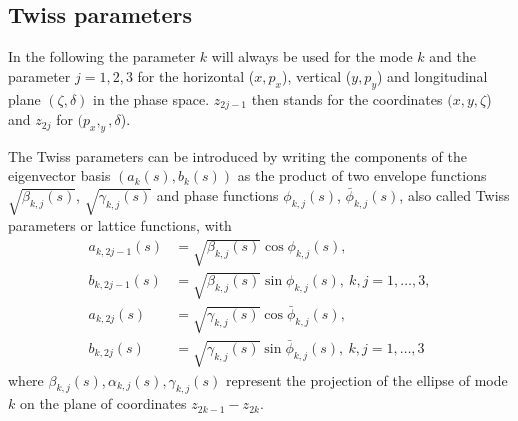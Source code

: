 \subsection{Twiss parameters}
\label{opt:sec:4}
In the following the parameter $k$ will always be used for the mode $k$ and the parameter
$j=1,2,3$ for the horizontal ($x,p_x$), vertical ($y,p_y$) and longitudinal plane
$(\zeta,\delta)$ in the phase space. $z_{2j-1}$ then stands for the coordinates $(x,y,\zeta$)
and $z_{2j}$ for $(p_x,_y,\delta$).

The Twiss parameters can be introduced by writing the components of the eigenvector basis
$(a_k(s),b_k(s))$ as the product of two envelope functions $\sqrt{\beta_{k,j}(s)}$,
$\sqrt{\gamma_{k,j}(s)}$ and phase functions $\phi_{k,j}(s)$, $\bar\phi_{k,j}(s)$,
also called Twiss parameters or lattice functions, with
\begin{align}
a_{k,2j-1}(s)&=\sqrt{\beta_{k,j}(s)}\cos{\phi_{k,j}(s)},\nonumber\\ b_{k,2j-1}(s)&=\sqrt{\beta_{k,j}(s)}\sin{\phi_{k,j}(s)}, \ k,j=1,\ldots,3, \label{opt:eqn:4:1}\\
a_{k,2j}(s)&=\sqrt{\gamma_{k,j}(s)}\cos{\bar\phi_{k,j}(s)}, \nonumber\\
b_{k,2j}(s)&=\sqrt{\gamma_{k,j}(s)}\sin{\bar\phi_{k,j}(s)}, \ k,j=1,\ldots,3 \label{opt:eqn:4:2}
\end{align}
where $\beta_{k,j}(s), \alpha_{k,j}(s), \gamma_{k,j}(s)$ represent the projection of the ellipse of mode $k$ on the plane of coordinates $z_{2k-1}-z_{2k}$. 

